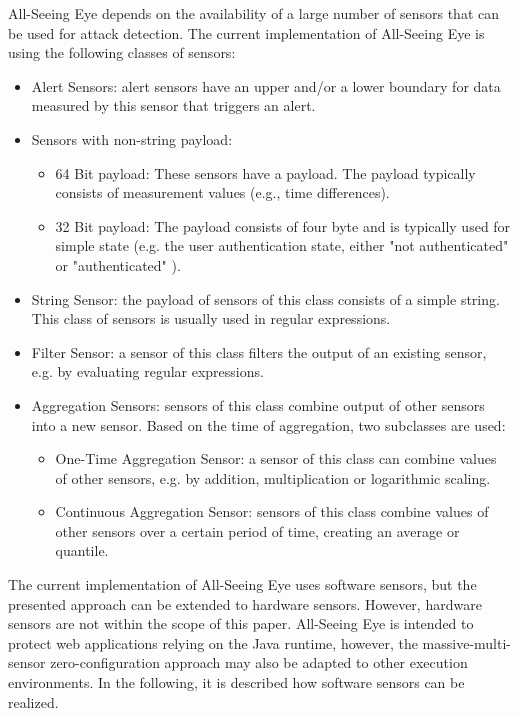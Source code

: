 \documentclass[conference]{IEEEtran}
\begin{document}
All-Seeing Eye depends on the availability of a large number of sensors that can be used for attack detection. The current implementation of All-Seeing Eye is using the following classes of sensors:
\begin{itemize}
	\item Alert Sensors: alert sensors have an upper and/or a lower boundary for data measured by this sensor that triggers an alert.
	\item Sensors with non-string payload: 
	\begin{itemize}
	\item 64 Bit payload: These sensors have a payload. The payload typically consists of measurement values (e.g., time differences).
	\item 32 Bit payload: The payload consists of four byte and is typically used for simple state (e.g. the user authentication state, either "not authenticated" or "authenticated" ).
	\end{itemize} 
	\item String Sensor: the payload of sensors of this class consists of a simple string. This class of sensors is usually used in regular expressions.
	\item Filter Sensor: a sensor of this class filters the output of an existing sensor, e.g. by evaluating regular expressions.
	\item Aggregation Sensors: sensors of this class combine output of other sensors into a new sensor. Based on the time of aggregation, two subclasses are used:
	\begin{itemize}
	\item One-Time Aggregation Sensor: a sensor of this class can combine values of other sensors, e.g. by addition, multiplication or logarithmic scaling.
	\item Continuous Aggregation Sensor: sensors of this class combine values of other sensors over a certain period of time, creating an average or quantile.	
	\end{itemize}
\end{itemize}

The current implementation of All-Seeing Eye uses software sensors, but the presented approach can be extended to hardware sensors. However, hardware sensors are not within the scope of this paper. All-Seeing Eye is intended to protect web applications relying on the Java runtime, however, the massive-multi-sensor zero-configuration approach may also be adapted to other execution environments. In the following, it is described how software sensors can be realized.
\end{document}
